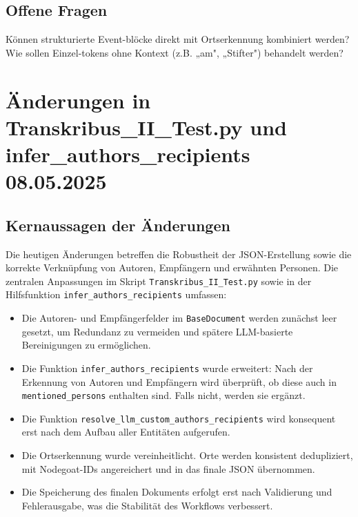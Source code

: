 \documentclass{article}
\begin{document}
\subsection*{Offene Fragen}
 Können strukturierte Event-blöcke direkt mit Ortserkennung kombiniert werden?\\
 Wie sollen Einzel-tokens ohne Kontext (z.B. „am", „Stifter") behandelt werden?\\

\noindent\hrulefill
\section{Änderungen in Transkribus\_II\_Test.py und infer\_authors\_recipients \small 08.05.2025}

\subsection*{Kernaussagen der Änderungen}
Die heutigen Änderungen betreffen die Robustheit der JSON-Erstellung sowie die korrekte Verknüpfung von Autoren, Empfängern und erwähnten Personen. Die zentralen Anpassungen im Skript \texttt{Transkribus\_II\_Test.py} sowie in der Hilfsfunktion \texttt{infer\_authors\_recipients} umfassen:

\begin{itemize}
    \item Die Autoren- und Empfängerfelder im \texttt{BaseDocument} werden zunächst leer gesetzt, um Redundanz zu vermeiden und spätere LLM-basierte Bereinigungen zu ermöglichen.
    \item Die Funktion \texttt{infer\_authors\_recipients} wurde erweitert: Nach der Erkennung von Autoren und Empfängern wird überprüft, ob diese auch in \texttt{mentioned\_persons} enthalten sind. Falls nicht, werden sie ergänzt.
    \item Die Funktion \texttt{resolve\_llm\_custom\_authors\_recipients} wird konsequent erst nach dem Aufbau aller Entitäten aufgerufen.
    \item Die Ortserkennung wurde vereinheitlicht. Orte werden konsistent dedupliziert, mit Nodegoat-IDs angereichert und in das finale JSON übernommen.
    \item Die Speicherung des finalen Dokuments erfolgt erst nach Validierung und Fehlerausgabe, was die Stabilität des Workflows verbessert.
\end{itemize}
\end{document}
